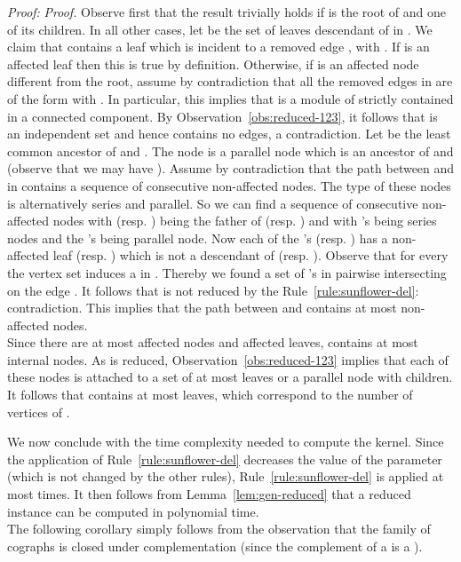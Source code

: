 \documentclass[11pt]{article}
\newenvironment{proof}{\noindent\textit{Proof: }}{{\hfill }}
\begin{document}
\begin{proof}
\emph{Proof.} Observe first that the result trivially holds if  is the root of  and  one of its children. In all other cases, let  be the set of leaves descendant of  in . We claim that  contains a leaf  which is incident to a removed edge , with . If  is an affected leaf then this is true by definition. Otherwise, if  is an affected node different from the root, assume by contradiction that all the removed edges in  are of the form  with . In particular, this implies that  is a module of  strictly contained in a connected component. By Observation~\ref{obs:reduced-123}, it follows that  is an independent set and hence contains no edges, a contradiction. 
Let  be the least common ancestor of  and . The node  is a parallel node which is an ancestor of  and  (observe that we may have ). Assume by contradiction that the path between  and  in  contains a sequence of  consecutive non-affected nodes. The type of these nodes is alternatively series and parallel. So we can find a sequence  of consecutive non-affected nodes with  (resp. ) being the father of  (resp. ) and with 's being series nodes and the 's being parallel node. Now each of the 's (resp. ) has a non-affected leaf  (resp. ) which is not a descendant of  (resp. ). Observe that for every  the vertex set  induces a  in . Thereby we found a set of  's in  pairwise intersecting on the edge . It follows that  is not reduced by the Rule~\ref{rule:sunflower-del}: contradiction. This implies that the path between  and  contains at most  non-affected nodes. 
\hfill  \\

Since there are at most  affected nodes and  affected leaves,  contains at most  internal nodes.
As  is reduced, Observation~\ref{obs:reduced-123} implies that each of these  nodes is attached to a set of at most  leaves or a parallel node with  children. It follows that  contains at most  leaves, which correspond to the number of vertices of . 

\medskip
We now conclude with the time complexity needed to compute the kernel. Since the application of Rule~\ref{rule:sunflower-del} decreases the value of the parameter (which is not changed by the other rules), Rule~\ref{rule:sunflower-del} is applied at most  times. It then follows from Lemma~\ref{lem:gen-reduced} that a reduced instance can be computed in polynomial time.
 \end{proof}\\
 
The following corollary simply follows from the observation that the family of cographs is closed under complementation (since the complement
 of a  is a ).
 
\end{document}
